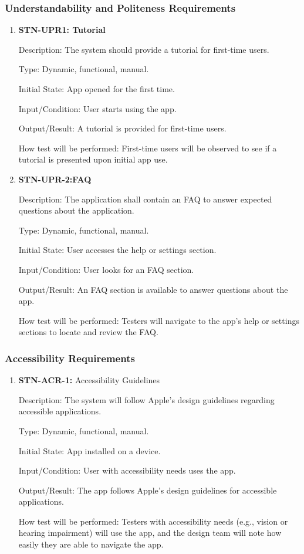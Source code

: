 \documentclass[12pt, titlepage]{article}
\begin{document}
\subsubsection{Understandability and Politeness Requirements}

\begin{enumerate}

\item {\textbf{STN-UPR1: Tutorial}}

Description: The system should provide a tutorial for first-time users. 

Type: Dynamic, functional, manual.

Initial State: App opened for the first time.

Input/Condition: User starts using the app.

Output/Result: A tutorial is provided for first-time users.

How test will be performed: First-time users will be observed to see if a tutorial is presented upon initial app use.


\item{\textbf{STN-UPR-2:FAQ}}

Description: The application shall contain an FAQ to answer expected questions about the application.

Type: Dynamic, functional, manual.

Initial State: User accesses the help or settings section.

Input/Condition: User looks for an FAQ section.

Output/Result: An FAQ section is available to answer questions about the app.

How test will be performed: Testers will navigate to the app's help or settings sections to locate and review the FAQ.

\end{enumerate}

\subsubsection{Accessibility Requirements}

\begin{enumerate}

\item {\textbf{STN-ACR-1: }Accessibility Guidelines}

Description: The system will follow Apple’s design guidelines regarding accessible applications.

Type: Dynamic, functional, manual.

Initial State: App installed on a device.

Input/Condition: User with accessibility needs uses the app.

Output/Result: The app follows Apple’s design guidelines for accessible applications.

How test will be performed: Testers with accessibility needs (e.g., vision or hearing impairment) will use the app, and the design team will note how easily they are able to navigate the app. 

\end{enumerate}
\end{document}
